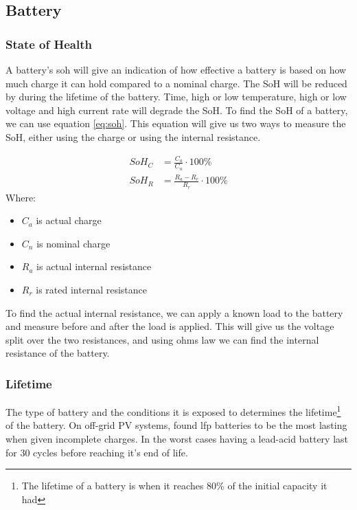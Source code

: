 \subsection{Battery}

\subsubsection{State of Health}
A battery's \acrfull{soh} will give an indication of how effective a battery is based on how much charge it can hold compared to a nominal charge. The SoH will be reduced by during the lifetime of the battery. Time, high or low temperature, high or low voltage and high current rate will degrade the SoH\citep{liuDataScienceBasedFullLifespan2022}. To find the SoH of a battery, we can use equation \eqref{eq:soh}. This equation will give us two ways to measure the SoH, either using the charge or using the internal resistance. 

\begin{align}
    SoH_{C} &= \frac{C_a}{C_n} \cdot 100\%  \\
    SoH_R &= \frac{R_a - R_r}{R_r} \cdot 100\% 
    \label{eq:soh}
\end{align}
Where:
\begin{itemize}
    \item $C_a$ is actual charge
    \item $C_n$ is nominal charge
    \item $R_a$ is actual internal resistance
    \item $R_r$ is rated internal resistance
\end{itemize}

To find the actual internal resistance, we can apply a known load to the battery and measure before and after the load is applied. This will give us the voltage split over the two resistances, and using ohms law we can find the internal resistance of the battery. 

\subsubsection{Lifetime}
The type of battery and the conditions it is exposed to determines the lifetime\footnote{The lifetime of a battery is when it reaches 80\% of the initial capacity it had} of the battery. On off-grid PV systems, \citep{wieczorekInfluenceCurrentOffgrid2023} found \acrfull{lfp} batteries to be the most lasting when given incomplete charges. In the worst cases having a lead-acid battery last for 30 cycles before reaching it's end of life. 
